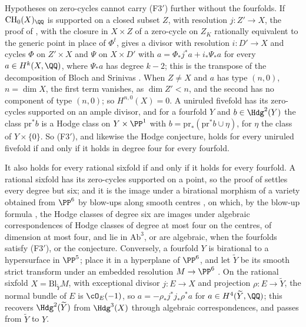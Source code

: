 \begin{remark}\label{rem:f3primesharp}
Hypotheses on zero-cycles cannot carry \textup{(F3$'$)} further without the
fourfolds. If $\mathrm{CH}_{0}(X)_{\QQ}$ is supported on a closed subset $Z$,
with resolution $j\colon Z'\to X$, the proof of ,
with the closure in $X\times Z$ of a zero-cycle on $Z_{K}$ rationally
equivalent to the generic point in place of $\Phi^{t}$, gives a divisor with
resolution $i\colon D'\to X$ and cycles $\Phi$ on $Z'\times X$ and $\Psi$ on
$X\times D'$ with $a=\Phi_{*}j^{*}a+i_{*}\Psi_{*}a$ for every
$a\in H^{k}(X,\QQ)$, where $\Psi_{*}a$ has degree $k-2$; this is the
transpose of the decomposition of Bloch and Srinivas \cite{BS83}. When
$Z\ne X$ and $a$ has type $(n,0)$, $n=\dim X$, the first term vanishes, as
$\dim Z'<n$, and the second has no component of type $(n,0)$; so
$H^{n,0}(X)=0$. A uniruled fivefold has its zero-cycles
supported on an ample divisor, and for a fourfold $Y$ and
$b\in\Hdg^{2}(Y)$ the class $\mathrm{pr}^{*}b$ is a Hodge class on
$Y\times\PP^{1}$ with $b=\mathrm{pr}_{*}(\mathrm{pr}^{*}b\cup\eta)$, for
$\eta$ the class of $Y\times\{0\}$. So \textup{(F3$'$)}, and likewise the
Hodge conjecture, holds for every uniruled fivefold if and only if it holds
in degree four for every fourfold.

It also holds for every rational sixfold if and only if it holds for every
fourfold. A rational sixfold has its zero-cycles supported on a point, so
the proof of  settles every degree but six; and it
is the image under a birational morphism of a variety obtained from
$\PP^{6}$ by blow-ups along smooth centres \cite{Hir64}, on which, by the
blow-up formula \cite[\S7.3.3]{Voi02}, the Hodge classes of degree six are
images under algebraic correspondences of Hodge classes of degree at most
four on the centres, of dimension at most four, and lie in
$\mathrm{Ab}^{3}$, or are algebraic, when the fourfolds satisfy
\textup{(F3$'$)}, or the conjecture. Conversely, a fourfold $Y$
is birational to a hypersurface in $\PP^{5}$; place it in a hyperplane of
$\PP^{6}$, and let $\widetilde Y$ be its smooth strict transform under an
embedded resolution $M\to\PP^{6}$ \cite{Hir64}. On the rational sixfold
$X=\mathrm{Bl}_{\widetilde Y}M$, with exceptional divisor $j\colon E\to X$
and projection $\rho\colon E\to\widetilde Y$, the normal bundle of $E$ is
$\cO_{E}(-1)$, so $a=-\rho_{*}j^{*}j_{*}\rho^{*}a$ for
$a\in H^{4}(\widetilde Y,\QQ)$; this recovers $\Hdg^{2}(\widetilde Y)$ from
$\Hdg^{3}(X)$ through algebraic correspondences, and
 passes from $\widetilde Y$ to $Y$.


\end{remark}
